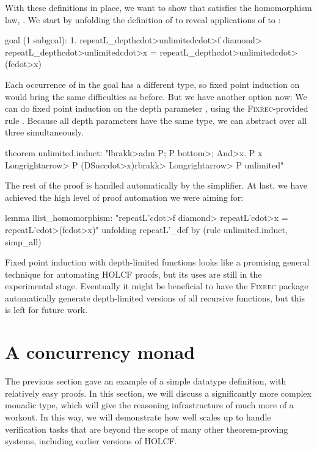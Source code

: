 With these definitions in place, we want to show that  satisfies the homomorphism law, . We start by unfolding the definition of  to reveal applications of  to :
%
\begin{isacode}
goal (1 subgoal):
 1. repeatL_depth\<cdot>unlimited\<cdot>f \<diamond> repeatL_depth\<cdot>unlimited\<cdot>x
    = repeatL_depth\<cdot>unlimited\<cdot>(f\<cdot>x)
\end{isacode}
%
Each occurrence of  in the goal has a different type, so fixed point induction on  would bring the same difficulties as before. But we have another option now: We can do fixed point induction on the depth parameter , using the \textsc{Fixrec}-provided rule . Because all depth parameters have the same type, we can abstract over all three simultaneously.
%
\begin{isacode}
theorem unlimited.induct:
  "\<lbrakk>adm P; P \<bottom>; \<And>x. P x \<Longrightarrow> P (DSuc\<cdot>x)\<rbrakk> \<Longrightarrow> P unlimited"
\end{isacode}
%
The rest of the proof is handled automatically by the simplifier. At last, we have achieved the high level of proof automation we were aiming for:
%
\begin{isacode}
lemma llist_homomorphism: "repeatL'\<cdot>f \<diamond> repeatL'\<cdot>x = repeatL'\<cdot>(f\<cdot>x)"
  unfolding repeatL'_def by (rule unlimited.induct, simp_all)
\end{isacode}

Fixed point induction with depth-limited functions looks like a promising general technique for automating HOLCF proofs, but its uses are still in the experimental stage. Eventually it might be beneficial to have the \textsc{Fixrec} package automatically generate depth-limited versions of all recursive functions, but this is left for future work.

\section{A concurrency monad}
\label{sec:case-concurrency-monad}

The previous section gave an example of a simple datatype definition, with relatively easy proofs. In this section, we will discuss a significantly more complex monadic type, which will give the reasoning infrastructure of  much more of a workout. In this way, we will demonstrate how well  scales up to handle verification tasks that are beyond the scope of many other theorem-proving systems, including earlier versions of HOLCF.


